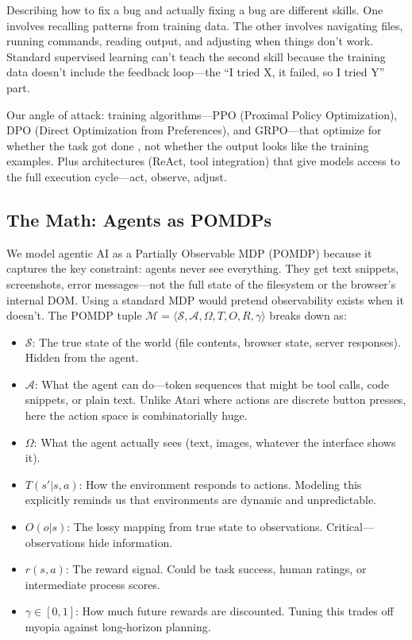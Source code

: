 \documentclass[12pt,a4paper]{report}
\theoremstyle{definition}
\begin{document}
Describing how to fix a bug and actually fixing a bug are different skills. One involves recalling patterns from training data. The other involves navigating files, running commands, reading output, and adjusting when things don't work. Standard supervised learning can't teach the second skill because the training data doesn't include the feedback loop---the ``I tried X, it failed, so I tried Y'' part.

Our angle of attack: training algorithms---PPO (Proximal Policy Optimization), DPO (Direct Optimization from Preferences), and GRPO---that optimize for whether the task got done
, not whether the output looks like the training examples. Plus architectures (ReAct, tool integration) that give models access to the full execution cycle---act, observe, adjust.

\subsection{The Math: Agents as POMDPs}
We model agentic AI as a Partially Observable MDP (POMDP) because it captures the key constraint: agents never see everything. They get text snippets, screenshots, error messages---not the full state of the filesystem or the browser's internal DOM. Using a standard MDP would pretend observability exists when it doesn't. The POMDP tuple $\mathcal{M} = \langle \mathcal{S}, \mathcal{A}, \Omega, T, O, R, \gamma \rangle$ breaks down as:
\begin{itemize}
    \item $\mathcal{S}$: The true state of the world (file contents, browser state, server responses). Hidden from the agent.
    \item $\mathcal{A}$: What the agent can do---token sequences that might be tool calls, code snippets, or plain text. Unlike Atari where actions are discrete button presses, here the action space is combinatorially huge.
    \item $\Omega$: What the agent actually sees (text, images, whatever the interface shows it).
    \item $T(s'|s,a)$: How the environment responds to actions. Modeling this explicitly reminds us that environments are dynamic and unpredictable.
    \item $O(o|s)$: The lossy mapping from true state to observations. Critical---observations hide information.
    \item $r(s,a)$: The reward signal. Could be task success, human ratings, or intermediate process scores.
    \item $\gamma \in [0,1]$: How much future rewards are discounted. Tuning this trades off myopia against long-horizon planning.
\end{itemize}
\end{document}
